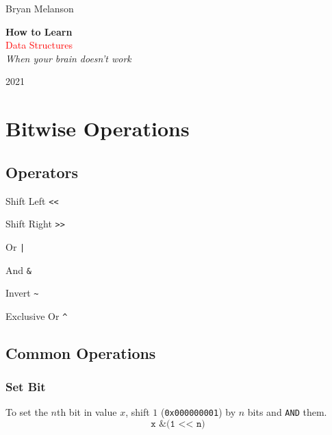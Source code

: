 \documentclass[11pt]{article}
\newcommand*{\plogo}{\fbox{$\mathcal{BM}$}}
\begin{document}
 

\begin{titlepage}

\raggedleft

\vspace*{\baselineskip}

{\Large Bryan Melanson}

\vspace*{0.167\textheight}

\textbf{\LARGE How to Learn}\\[\baselineskip]

{\textcolor{Red}{\Huge Data Structures}}\\[\baselineskip]

{\Large \textit{When your brain doesn't work}}

\vfill

{\large 2021 ~~\plogo}

\vspace*{3\baselineskip}

\end{titlepage}

\pagebreak
\tableofcontents
\pagebreak
\section{Bitwise Operations}
\subsection{Operators}
\begin{list}{}{}
    \item Shift Left \texttt{<<}
    \item Shift Right \texttt{>>}
    \item Or \texttt{|}
    \item And \texttt{\&}
    \item Invert \texttt{\textasciitilde}
    \item Exclusive Or \texttt{\textasciicircum}
\end{list}
\subsection{Common Operations}
\subsubsection{Set Bit}
To set the $n$th bit in value $x$, shift $1$ (\texttt{0x000000001}) by $n$ bits and \texttt{AND} them.
$$\texttt{x \& (1 << n)}$$
\end{document}
